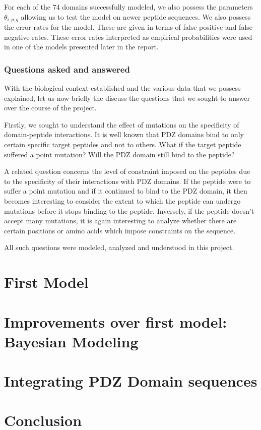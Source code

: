 \documentclass[a4paper, 12pt]{article}
\begin{document}
	For each of the 74 domains successfully modeled, we also possess the parameters $\theta_{i,p,q}$ allowing us to test the model on newer peptide sequences. We also possess the error rates for the model. These are given in terms of false positive and false negative rates. These error rates interpreted as empirical probabilities were used in one of the models presented later in the report.

	\section{Questions asked and answered}

	With the biological context established and the various data that we possess explained, let us now briefly the discuss the questions that we sought to answer over the course of the project. 

	Firstly, we sought to understand the effect of mutations on the specificity of domain-peptide interactions. It is well known that PDZ domains bind to only certain specific target peptides and not to others. What if the target peptide suffered a point mutation? Will the PDZ domain still bind to the peptide? 

	A related question concerns the level of constraint imposed on the peptides due to the specificity of their interactions with PDZ domains. If the peptide were to suffer a point mutation and if it continued to bind to the PDZ domain, it then becomes interesting to consider the extent to which the peptide can undergo mutations before it stops binding to the peptide. Inversely, if the peptide doesn't accept many mutations, it is again interesting to analyze whether there are certain positions or amino acids which impose constraints on the sequence. 

	All such questions were modeled, analyzed and understood in this project.

\part{First Model}
\part{Improvements over first model: Bayesian Modeling}
\part{Integrating PDZ Domain sequences} 
\part{Conclusion}
\end{document}
